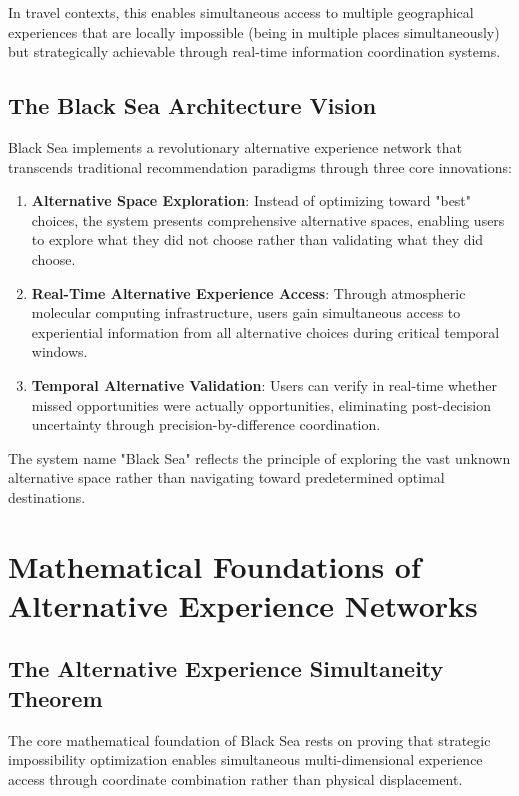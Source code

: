 \documentclass[12pt,a4paper]{article}
\begin{document}
In travel contexts, this enables simultaneous access to multiple geographical experiences that are locally impossible (being in multiple places simultaneously) but strategically achievable through real-time information coordination systems.

\subsection{The Black Sea Architecture Vision}

Black Sea implements a revolutionary alternative experience network that transcends traditional recommendation paradigms through three core innovations:

\begin{enumerate}
\item \textbf{Alternative Space Exploration}: Instead of optimizing toward "best" choices, the system presents comprehensive alternative spaces, enabling users to explore what they did not choose rather than validating what they did choose.

\item \textbf{Real-Time Alternative Experience Access}: Through atmospheric molecular computing infrastructure, users gain simultaneous access to experiential information from all alternative choices during critical temporal windows.

\item \textbf{Temporal Alternative Validation}: Users can verify in real-time whether missed opportunities were actually opportunities, eliminating post-decision uncertainty through precision-by-difference coordination.
\end{enumerate}

The system name "Black Sea" reflects the principle of exploring the vast unknown alternative space rather than navigating toward predetermined optimal destinations.

\section{Mathematical Foundations of Alternative Experience Networks}

\subsection{The Alternative Experience Simultaneity Theorem}

The core mathematical foundation of Black Sea rests on proving that strategic impossibility optimization enables simultaneous multi-dimensional experience access through coordinate combination rather than physical displacement.
\end{document}
